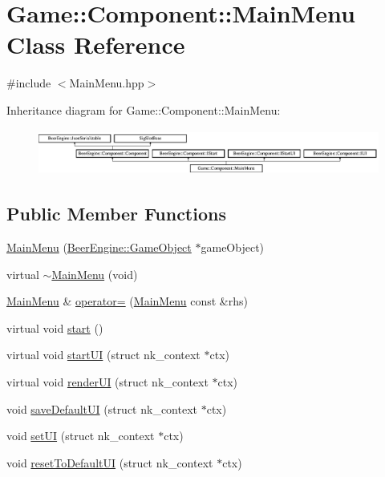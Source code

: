 \hypertarget{class_game_1_1_component_1_1_main_menu}{}\section{Game\+:\+:Component\+:\+:Main\+Menu Class Reference}
\label{class_game_1_1_component_1_1_main_menu}


{\ttfamily \#include $<$Main\+Menu.\+hpp$>$}

Inheritance diagram for Game\+:\+:Component\+:\+:Main\+Menu\+:\begin{figure}[H]
\begin{center}
\leavevmode
\includegraphics[height=1.500000cm]{class_game_1_1_component_1_1_main_menu}
\end{center}
\end{figure}
\subsection*{Public Member Functions}
\begin{DoxyCompactItemize}
\item 
\mbox{\hyperlink{class_game_1_1_component_1_1_main_menu_a9c2d8ecb603add206dfbf649cec13d02}{Main\+Menu}} (\mbox{\hyperlink{class_beer_engine_1_1_game_object}{Beer\+Engine\+::\+Game\+Object}} $\ast$game\+Object)
\item 
virtual \mbox{\hyperlink{class_game_1_1_component_1_1_main_menu_a5a631866a68545d0a825453517d5e1c1}{$\sim$\+Main\+Menu}} (void)
\item 
\mbox{\hyperlink{class_game_1_1_component_1_1_main_menu}{Main\+Menu}} \& \mbox{\hyperlink{class_game_1_1_component_1_1_main_menu_ad8a5f072da38a95bdda3f9747cf6e1fa}{operator=}} (\mbox{\hyperlink{class_game_1_1_component_1_1_main_menu}{Main\+Menu}} const \&rhs)
\item 
virtual void \mbox{\hyperlink{class_game_1_1_component_1_1_main_menu_a9043ca6c0ead0ef5fc048ac84171b597}{start}} ()
\item 
virtual void \mbox{\hyperlink{class_game_1_1_component_1_1_main_menu_ae50614def462ca82eb6c4404ee82a82e}{start\+UI}} (struct nk\+\_\+context $\ast$ctx)
\item 
virtual void \mbox{\hyperlink{class_game_1_1_component_1_1_main_menu_a36f876bbeca9056e17c6d13b82fc3364}{render\+UI}} (struct nk\+\_\+context $\ast$ctx)
\item 
void \mbox{\hyperlink{class_game_1_1_component_1_1_main_menu_a8feea01a9e2b3e4a06efd810a2ef5464}{save\+Default\+UI}} (struct nk\+\_\+context $\ast$ctx)
\item 
void \mbox{\hyperlink{class_game_1_1_component_1_1_main_menu_a48c58d26af82bc24b8930b18f56fdc2f}{set\+UI}} (struct nk\+\_\+context $\ast$ctx)
\item 
void \mbox{\hyperlink{class_game_1_1_component_1_1_main_menu_aab4b543fd346e0f2e5953cc985692f9c}{reset\+To\+Default\+UI}} (struct nk\+\_\+context $\ast$ctx)
\end{DoxyCompactItemize}
